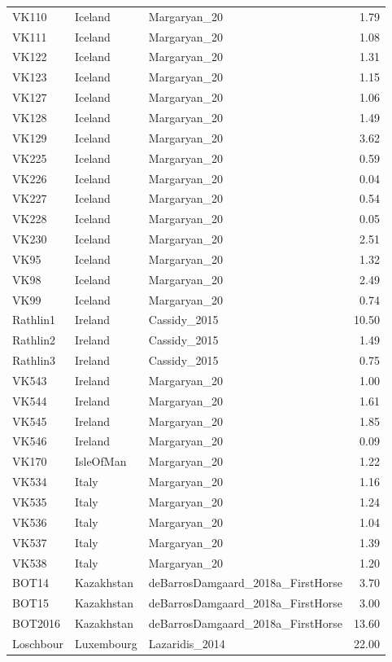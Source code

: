 \begin{longtable}[t]{lllr}
VK110 & Iceland & Margaryan\_20 & 1.79\\
VK111 & Iceland & Margaryan\_20 & 1.08\\
VK122 & Iceland & Margaryan\_20 & 1.31\\
VK123 & Iceland & Margaryan\_20 & 1.15\\
VK127 & Iceland & Margaryan\_20 & 1.06\\
VK128 & Iceland & Margaryan\_20 & 1.49\\
VK129 & Iceland & Margaryan\_20 & 3.62\\
VK225 & Iceland & Margaryan\_20 & 0.59\\
VK226 & Iceland & Margaryan\_20 & 0.04\\
VK227 & Iceland & Margaryan\_20 & 0.54\\
VK228 & Iceland & Margaryan\_20 & 0.05\\
VK230 & Iceland & Margaryan\_20 & 2.51\\
VK95 & Iceland & Margaryan\_20 & 1.32\\
VK98 & Iceland & Margaryan\_20 & 2.49\\
VK99 & Iceland & Margaryan\_20 & 0.74\\
Rathlin1 & Ireland & Cassidy\_2015 & 10.50\\
Rathlin2 & Ireland & Cassidy\_2015 & 1.49\\
Rathlin3 & Ireland & Cassidy\_2015 & 0.75\\
VK543 & Ireland & Margaryan\_20 & 1.00\\
VK544 & Ireland & Margaryan\_20 & 1.61\\
VK545 & Ireland & Margaryan\_20 & 1.85\\
VK546 & Ireland & Margaryan\_20 & 0.09\\
VK170 & IsleOfMan & Margaryan\_20 & 1.22\\
VK534 & Italy & Margaryan\_20 & 1.16\\
VK535 & Italy & Margaryan\_20 & 1.24\\
VK536 & Italy & Margaryan\_20 & 1.04\\
VK537 & Italy & Margaryan\_20 & 1.39\\
VK538 & Italy & Margaryan\_20 & 1.20\\
BOT14 & Kazakhstan & deBarrosDamgaard\_2018a\_FirstHorse & 3.70\\
BOT15 & Kazakhstan & deBarrosDamgaard\_2018a\_FirstHorse & 3.00\\
BOT2016 & Kazakhstan & deBarrosDamgaard\_2018a\_FirstHorse & 13.60\\
Loschbour & Luxembourg & Lazaridis\_2014 & 22.00\\

\end{longtable}
